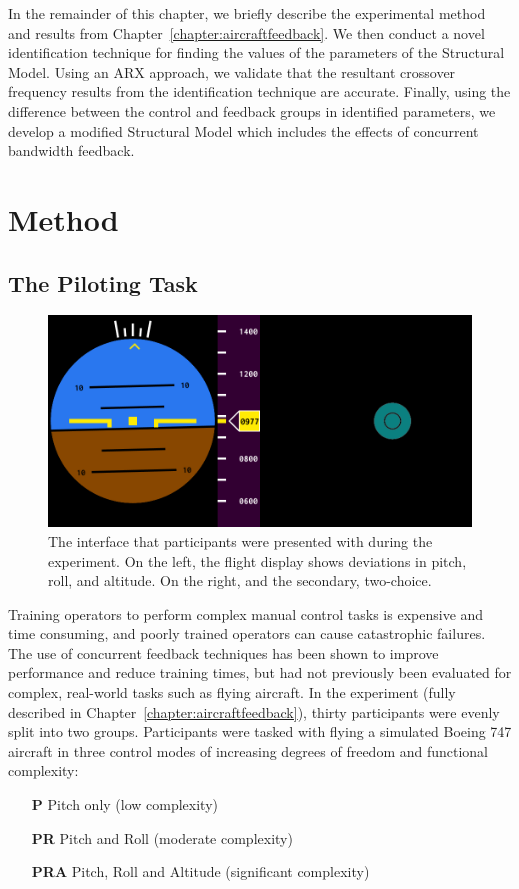 In the remainder of this chapter, we briefly describe the experimental method and results from Chapter~\ref{chapter:aircraftfeedback}.
We then conduct a novel identification technique for finding the values of the parameters of the Structural Model.
Using an ARX approach, we validate that the resultant crossover frequency results from the identification technique are accurate.
Finally, using the difference between the control and feedback groups in identified parameters, we develop a modified Structural Model which includes the effects of concurrent bandwidth feedback.

\section{Method}

\subsection{The Piloting Task}

\begin{figure}[b]
    \centering
    \includegraphics[width=0.8\linewidth]{figures/Aircraft/image1.png}
    \caption[The interface]{The interface that participants were presented with during the experiment. On the left, the flight display shows deviations in pitch, roll, and altitude. On the right, and the secondary, two-choice.}
    \label{fig:display}
\end{figure}

Training operators to perform complex manual control tasks is expensive and time consuming, and poorly trained operators can cause catastrophic failures.
The use of concurrent feedback techniques has been shown to improve performance and reduce training times, but had not previously been evaluated for complex, real-world tasks such as flying aircraft.
In the experiment (fully described in Chapter~\ref{chapter:aircraftfeedback}), thirty participants were evenly split into two groups.
Participants were tasked with flying a simulated Boeing 747 aircraft in three control modes of increasing degrees of freedom and functional complexity:
\begin{itemize}
    \item[\textbf{P}] Pitch only (low complexity)
    \item[\textbf{PR}] Pitch and Roll (moderate complexity)
    \item[\textbf{PRA}] Pitch, Roll and Altitude (significant complexity)
\end{itemize}

